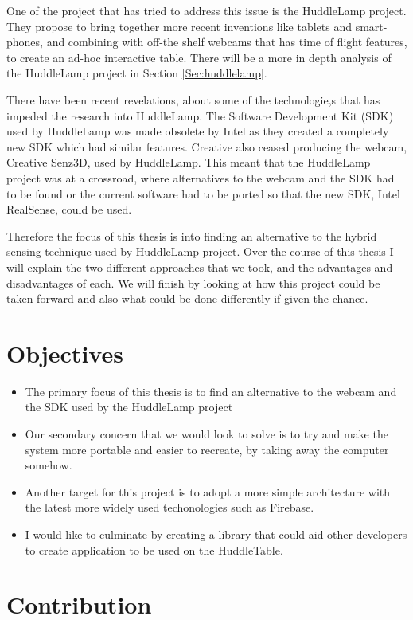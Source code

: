 One of the project that has tried to address this issue is the HuddleLamp project\cite{huddlelamp-paper}. They propose to bring together more recent inventions like tablets and smart-phones, and combining with off-the shelf webcams that has time of flight features, to create an ad-hoc interactive table. There will be a more in depth analysis of the HuddleLamp project in Section \ref{Sec:huddlelamp}.

There have been recent revelations, about some of the technologie,s that has impeded the research into HuddleLamp. The Software Development Kit (SDK) used by HuddleLamp was made obsolete by Intel as they created a completely new SDK which had similar features. Creative also ceased producing the webcam, Creative Senz3D, used by HuddleLamp. This meant that the HuddleLamp project was at a crossroad, where alternatives to the webcam and the SDK had to be found or the current software had to be ported so that the new SDK, Intel RealSense\cite{intel-realsense}, could be used.

Therefore the focus of this thesis is into finding an alternative to the hybrid sensing technique used by HuddleLamp project. Over the course of this thesis I will explain the two different approaches that we took, and the advantages and disadvantages of each. We will finish by looking at how this project could be taken forward and also what could be done differently if given the chance.


\section{Objectives}

\begin{itemize}
\item The primary focus of this thesis is to find an alternative to the webcam and the SDK used by the HuddleLamp project
\item Our secondary concern that we would look to solve is to try and make the system more portable and easier to recreate, by taking away the computer somehow.
\item Another target for this project is to adopt a more simple architecture with the latest more widely used techonologies such as Firebase.
\item I would like to culminate by creating a library that could aid other developers to create application to be used on the HuddleTable.
\end{itemize}

\section{Contribution}

